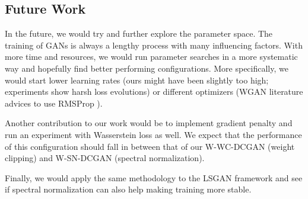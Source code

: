 
\subsection{Future Work}
In the future, we would try and further explore the parameter space. The training of GANs is always a lengthy process with many influencing factors. With more time and resources, we would run parameter searches in a more systematic way and hopefully find better performing configurations. More specifically, we would start lower learning rates (ours might have been slightly too high; experiments show harsh loss evolutions) or different optimizers (WGAN literature advices to use RMSProp \cite{arjovsky2017wasserstein}).

Another contribution to our work would be to implement gradient penalty and run an experiment with Wasserstein loss as well. We expect that the performance of this configuration should fall in between that of our W-WC-DCGAN (weight clipping) and W-SN-DCGAN (spectral normalization).

Finally, we would apply the same methodology to the LSGAN framework \cite{mao2017least} and see if spectral normalization can also help making training more stable. 

